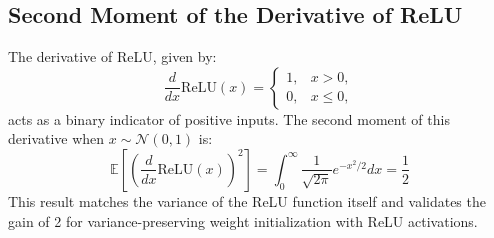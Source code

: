 \documentclass{article} %
\theoremstyle{plain}
\theoremstyle{definition}
\theoremstyle{remark}
\begin{document}
\subsection{Second Moment of the Derivative of ReLU}
The derivative of ReLU, given by:
\begin{equation}
\frac{d}{dx} \text{ReLU}(x) =
\begin{cases}
1, & x > 0, \\
0, & x \leq 0,
\end{cases}
\end{equation}
acts as a binary indicator of positive inputs. The second moment of this derivative when \( x \sim \mathcal{N}(0, 1) \) is:
\begin{equation}
\mathbb{E}\left[\left(\frac{d}{dx} \text{ReLU}(x)\right)^2\right] = \int_{0}^{\infty}  \frac{1}{\sqrt{2\pi}} e^{-x^2/2} dx = \frac{1}{2}
\end{equation}
This result matches the variance of the ReLU function itself and validates the gain of 2 for variance-preserving weight initialization with ReLU activations.
\end{document}
